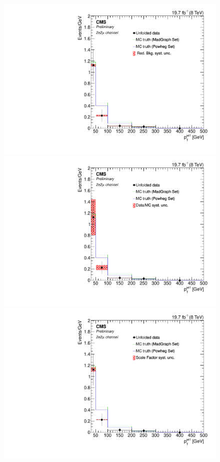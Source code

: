 \begin{figure}[hbtp]
\begin{center}
   \includegraphics[width=0.8\cmsFigWidth]{Figures/Unfolding/Systematics/ZZTo2e2m_PtJet1_RedBkg_Mad_fr}     
   \includegraphics[width=0.8\cmsFigWidth]{Figures/Unfolding/Systematics/ZZTo2e2m_PtJet1_UnfDataOverGenMC_Mad_fr}     
   \includegraphics[width=0.8\cmsFigWidth]{Figures/Unfolding/Systematics/ZZTo2e2m_PtJet1_SFSq_Mad_fr}

\end{center}
\end{figure}

